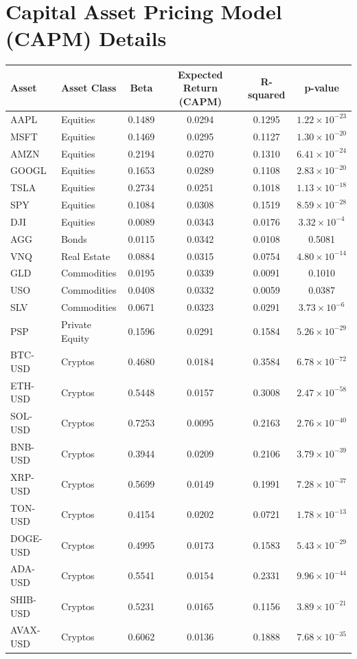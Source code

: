 \appendix
\setcounter{section}{0}
\section{Capital Asset Pricing Model (CAPM) Details}\label{appendix:capm_details}

\begin{longtable}{|l|l|c|c|c|c|}
\hline
\textbf{Asset} & \textbf{Asset Class} & \textbf{Beta} & \textbf{Expected Return (CAPM)} & \textbf{R-squared} & \textbf{p-value} \\
\hline
AAPL & Equities & 0.1489 & 0.0294 & 0.1295 & $1.22 \times 10^{-23}$ \\
MSFT & Equities & 0.1469 & 0.0295 & 0.1127 & $1.30 \times 10^{-20}$ \\
AMZN & Equities & 0.2194 & 0.0270 & 0.1310 & $6.41 \times 10^{-24}$ \\
GOOGL & Equities & 0.1653 & 0.0289 & 0.1108 & $2.83 \times 10^{-20}$ \\
TSLA & Equities & 0.2734 & 0.0251 & 0.1018 & $1.13 \times 10^{-18}$ \\
SPY & Equities & 0.1084 & 0.0308 & 0.1519 & $8.59 \times 10^{-28}$ \\
DJI & Equities & 0.0089 & 0.0343 & 0.0176 & $3.32 \times 10^{-4}$ \\
AGG & Bonds & 0.0115 & 0.0342 & 0.0108 & 0.5081 \\
VNQ & Real Estate & 0.0884 & 0.0315 & 0.0754 & $4.80 \times 10^{-14}$ \\
GLD & Commodities & 0.0195 & 0.0339 & 0.0091 & 0.1010 \\
USO & Commodities & 0.0408 & 0.0332 & 0.0059 & 0.0387 \\
SLV & Commodities & 0.0671 & 0.0323 & 0.0291 & $3.73 \times 10^{-6}$ \\
PSP & Private Equity & 0.1596 & 0.0291 & 0.1584 & $5.26 \times 10^{-29}$ \\
BTC-USD & Cryptos & 0.4680 & 0.0184 & 0.3584 & $6.78 \times 10^{-72}$ \\
ETH-USD & Cryptos & 0.5448 & 0.0157 & 0.3008 & $2.47 \times 10^{-58}$ \\
SOL-USD & Cryptos & 0.7253 & 0.0095 & 0.2163 & $2.76 \times 10^{-40}$ \\
BNB-USD & Cryptos & 0.3944 & 0.0209 & 0.2106 & $3.79 \times 10^{-39}$ \\
XRP-USD & Cryptos & 0.5699 & 0.0149 & 0.1991 & $7.28 \times 10^{-37}$ \\
TON-USD & Cryptos & 0.4154 & 0.0202 & 0.0721 & $1.78 \times 10^{-13}$ \\
DOGE-USD & Cryptos & 0.4995 & 0.0173 & 0.1583 & $5.43 \times 10^{-29}$ \\
ADA-USD & Cryptos & 0.5541 & 0.0154 & 0.2331 & $9.96 \times 10^{-44}$ \\
SHIB-USD & Cryptos & 0.5231 & 0.0165 & 0.1156 & $3.89 \times 10^{-21}$ \\
AVAX-USD & Cryptos & 0.6062 & 0.0136 & 0.1888 & $7.68 \times 10^{-35}$ \\
\hline
\end{longtable}

